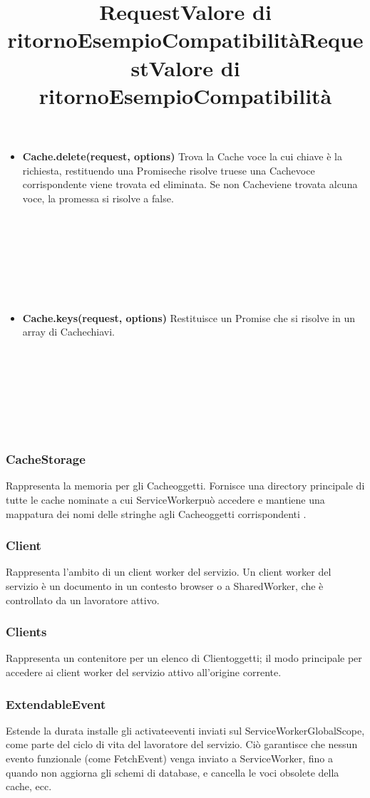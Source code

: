 \documentclass[italian]{article}
\begin{document}
\begin{itemize}
	
	
	\item \textbf{Cache.delete(request, options)}
	Trova la Cache voce la cui chiave è la richiesta, restituendo una Promiseche risolve truese una Cachevoce corrispondente viene trovata ed eliminata. Se non Cacheviene trovata alcuna voce, la promessa si risolve a  false.\\
	\title{\textbf{Request}}\\
	\title{\textbf{Valore di ritorno}}\\
	\title{\textbf{Esempio}}\\
	\title{\textbf{Compatibilità}}\\
	
	
	
	\item \textbf{Cache.keys(request, options)}
	Restituisce un Promise che si risolve in un array di Cachechiavi.\\
	\title{\textbf{Request}}\\
	\title{\textbf{Valore di ritorno}}\\
	\title{\textbf{Esempio}}\\
	\title{\textbf{Compatibilità}}\\
	
	
	
\end{itemize}


\subsubsection{CacheStorage}
Rappresenta la memoria per gli Cacheoggetti. Fornisce una directory principale di tutte le cache nominate a cui ServiceWorkerpuò accedere e mantiene una mappatura dei nomi delle stringhe agli Cacheoggetti corrispondenti .
\subsubsection{Client}
Rappresenta l'ambito di un client worker del servizio. Un client worker del servizio è un documento in un contesto browser o a SharedWorker, che è controllato da un lavoratore attivo.
\subsubsection{Clients}
Rappresenta un contenitore per un elenco di Clientoggetti; il modo principale per accedere ai client worker del servizio attivo all'origine corrente.
\subsubsection{ExtendableEvent}
Estende la durata installe gli activateeventi inviati sul ServiceWorkerGlobalScope, come parte del ciclo di vita del lavoratore del servizio. Ciò garantisce che nessun evento funzionale (come FetchEvent) venga inviato a ServiceWorker, fino a quando non aggiorna gli schemi di database, e cancella le voci obsolete della cache, ecc.
\end{document}
